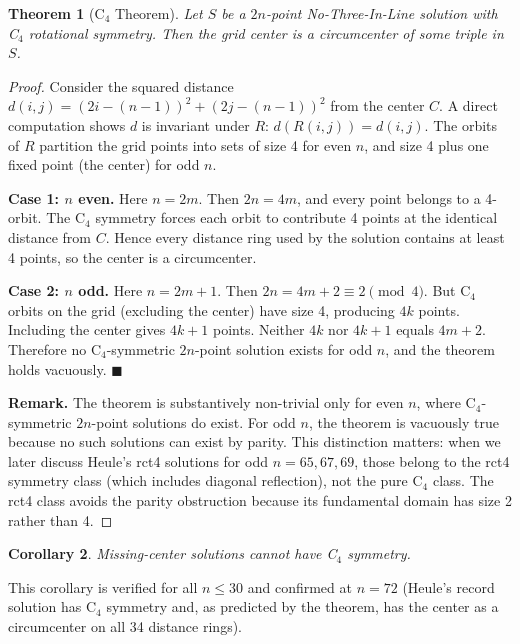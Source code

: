 \documentclass[11pt,a4paper]{article}
\theoremstyle{plain}
\newtheorem{theorem}{Theorem}[section]
\newtheorem{corollary}[theorem]{Corollary}
\theoremstyle{definition}
\begin{document}
\begin{theorem}[C$_4$ Theorem]
\label{thm:c4}
Let $S$ be a $2n$-point No-Three-In-Line solution with C$_4$ rotational symmetry. Then the grid center is a circumcenter of some triple in $S$.
\end{theorem}

\begin{proof}
Consider the squared distance $d(i,j) = (2i-(n-1))^2 + (2j-(n-1))^2$ from the center $C$. A direct computation shows $d$ is invariant under $R$: $d(R(i,j)) = d(i,j)$. The orbits of $R$ partition the grid points into sets of size 4 for even $n$, and size 4 plus one fixed point (the center) for odd $n$.

\textbf{Case 1: $n$ even.} Here $n=2m$. Then $2n=4m$, and every point belongs to a 4-orbit. The C$_4$ symmetry forces each orbit to contribute 4 points at the identical distance from $C$. Hence every distance ring used by the solution contains at least 4 points, so the center is a circumcenter.

\textbf{Case 2: $n$ odd.} Here $n=2m+1$. Then $2n=4m+2\equiv2\pmod{4}$. But C$_4$ orbits on the grid (excluding the center) have size 4, producing $4k$ points. Including the center gives $4k+1$ points. Neither $4k$ nor $4k+1$ equals $4m+2$. Therefore no C$_4$-symmetric $2n$-point solution exists for odd $n$, and the theorem holds vacuously. $\blacksquare$

\noindent\textbf{Remark.} The theorem is substantively non-trivial only for even $n$, where C$_4$-symmetric $2n$-point solutions do exist. For odd $n$, the theorem is vacuously true because no such solutions can exist by parity. This distinction matters: when we later discuss Heule's rct4 solutions for odd $n=65,67,69$, those belong to the rct4 symmetry class (which includes diagonal reflection), not the pure C$_4$ class. The rct4 class avoids the parity obstruction because its fundamental domain has size 2 rather than 4.
\end{proof}

\begin{corollary}
Missing-center solutions cannot have C$_4$ symmetry.
\end{corollary}

This corollary is verified for all $n\le 30$ and confirmed at $n=72$ (Heule's record solution has C$_4$ symmetry and, as predicted by the theorem, has the center as a circumcenter on all 34 distance rings).
\end{document}
